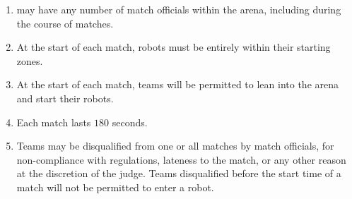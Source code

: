 \begin{enumerate}
  \item \org may have any number of match officials within the arena, including
        during the course of matches.
  \item At the start of each match, robots must be entirely within their
        starting zones.
  \item At the start of each match, teams will be permitted to lean into the
        arena and start their robots.
  \item Each match lasts $180$ seconds.
  \item Teams may be disqualified from one or all matches by match officials,
        for non-compliance with regulations, lateness to the match, or any other
        reason at the discretion of the judge. Teams disqualified before the
        start time of a match will not be permitted to enter a robot.
\end{enumerate}

